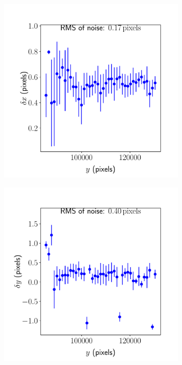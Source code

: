 \documentclass{article}
\begin{document}
\begin{figure}[ht]
\begin{subfigure}{0.24\linewidth}
		\caption{}
		\label{fig:sinewave2yxAKY}
	\end{subfigure}
	\begin{subfigure}{0.24\linewidth}
		\includegraphics[width=\linewidth]{sine-wave-2-xy-AKY.pdf}
		\caption{}
		\label{fig:sinewave2xyAKY}
	\end{subfigure}
	\begin{subfigure}{0.24\linewidth}
		\includegraphics[width=\linewidth]{sine-wave-2-yy-AKY.pdf}

\end{subfigure}
\end{figure}
\end{document}
